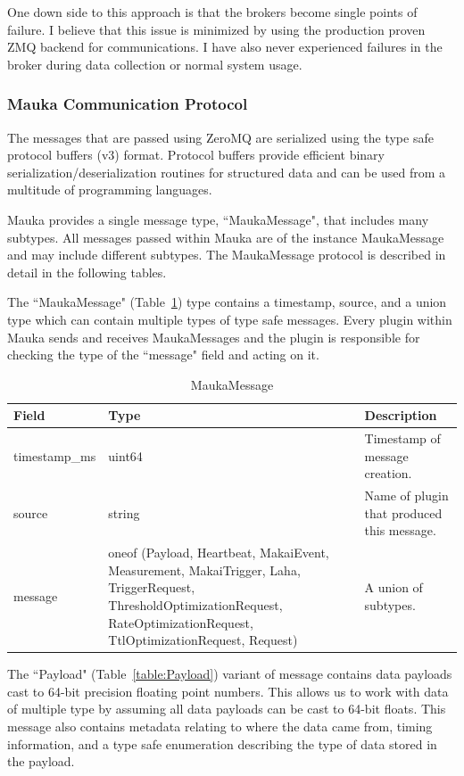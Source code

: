 One down side to this approach is that the brokers become single points of failure. I believe that this issue is minimized by using the production proven ZMQ backend for communications. I have also never experienced failures in the broker during data collection or normal system usage.

\subsubsection{Mauka Communication Protocol}
The messages that are passed using ZeroMQ are serialized using the type safe protocol buffers (v3) format. Protocol buffers provide efficient binary serialization/deserialization routines for structured data and can be used from a multitude of programming languages.

Mauka provides a single message type, ``MaukaMessage", that includes many subtypes. All messages passed within Mauka are of the instance MaukaMessage and may include different subtypes. The MaukaMessage protocol is described in detail in the following tables.

The ``MaukaMessage" (Table~\ref{table:MaukaMessage}) type contains a timestamp, source, and a union type which can contain multiple types of type safe messages. Every plugin within Mauka sends and receives MaukaMessages and the plugin is responsible for checking the type of the ``message" field and acting on it.

\begin{table}[H]
	\centering
	\caption{MaukaMessage}
	\begin{tabularx}{\textwidth}{lXX}
		\toprule
		\textbf{Field} & \textbf{Type} & \textbf{Description} \\
		\midrule
		timestamp\_ms & uint64 & Timestamp of message creation.  \\
		source & string & Name of plugin that produced this message. \\
		message & oneof (Payload, Heartbeat, MakaiEvent, Measurement, MakaiTrigger, Laha, TriggerRequest, ThresholdOptimizationRequest, RateOptimizationRequest, TtlOptimizationRequest, Request) & A union of subtypes. \\
		\bottomrule
	\end{tabularx}
	\label{table:MaukaMessage}
\end{table}

The ``Payload" (Table~\ref{table:Payload}) variant of message contains data payloads cast to 64-bit precision floating point numbers. This allows us to work with data of multiple type by assuming all data payloads can be cast to 64-bit floats. This message also contains metadata relating to where the data came from, timing information, and a type safe enumeration describing the type of data stored in the payload.

